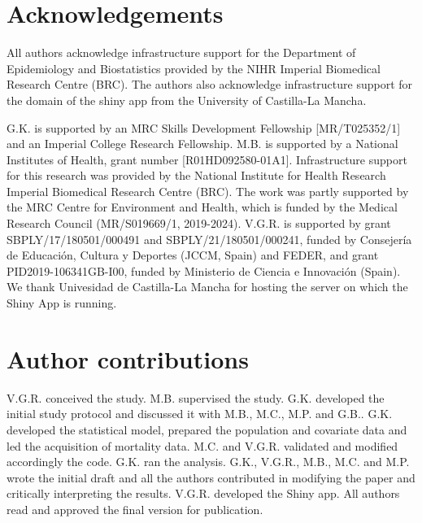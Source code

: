 \section*{Acknowledgements}
		
All authors acknowledge infrastructure support for the Department of Epidemiology and Biostatistics provided by the NIHR Imperial Biomedical Research Centre (BRC). The authors also acknowledge infrastructure support for the domain of the shiny app from the University of Castilla-La Mancha.
		
G.K. is supported by an MRC Skills Development Fellowship [MR/T025352/1] and an Imperial College Research Fellowship. M.B. is supported by a National Institutes of Health, grant number [R01HD092580-01A1]. Infrastructure support for this research was provided by the National Institute for Health Research Imperial Biomedical Research Centre (BRC). The work was partly supported by the MRC Centre for Environment and Health, which is funded by the Medical Research Council (MR/S019669/1, 2019-2024). V.G.R. is supported by grant SBPLY/17/180501/000491 and SBPLY/21/180501/000241, funded by Consejer\'ia de Educaci\'on, Cultura y Deportes (JCCM, Spain) and FEDER, and grant PID2019-106341GB-I00, funded by Ministerio de Ciencia e Innovaci\'on (Spain). We thank Univesidad de Castilla-La Mancha for hosting the server on which the Shiny App is running.
		
		
\section*{Author contributions}
		
V.G.R. conceived the study. M.B. supervised the study. G.K. developed the initial study protocol and discussed it with M.B., M.C., M.P. and G.B.. G.K. developed the statistical model, prepared the population and covariate data and led the acquisition of mortality data. M.C. and V.G.R. validated and modified accordingly the code. G.K. ran the analysis. G.K., V.G.R., M.B., M.C. and M.P. wrote the initial draft and all the authors contributed in modifying the paper and critically interpreting the results. V.G.R. developed the Shiny app. All authors read and approved the final version for publication.
		
		
